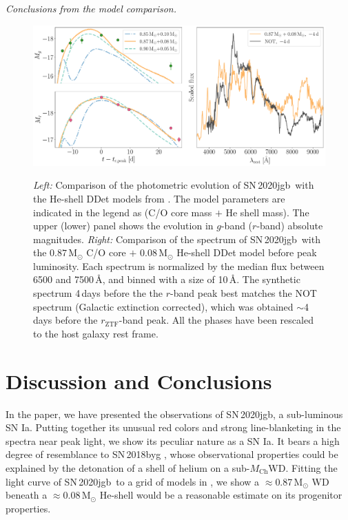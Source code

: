\documentclass[twocolumn]{aastex631}
\newcommand{\sn}{SN\,2020jgb}
\newcommand{\Mch}{$M_\mathrm{Ch}$}
\begin{document}
{\it Conclusions from the model comparison.}

\begin{figure}
    \centering
    \includegraphics[width=\textwidth]{model.pdf}
    \label{fig:model}
    \caption{{\it Left:} Comparison of the photometric evolution of \sn\ with the He-shell DDet models from \citet{polin_observational_2019}. The model parameters are indicated in the legend as (C/O core mass $+$ He shell mass). The upper (lower) panel shows the evolution in $g$-band ($r$-band) absolute magnitudes. {\it Right:} Comparison of the spectrum of \sn\ with the $0.87\,\mathrm{M_\odot}$ C/O core $+$ $0.08\,\mathrm{M_\odot}$ He-shell DDet model before peak luminosity. Each spectrum is normalized by the median flux between 6500 and 7500\,\r{A}, and binned with a size of 10\,\r{A}. The synthetic spectrum 4\,days before the the $r$-band peak best matches the NOT spectrum (Galactic extinction corrected), which was obtained $\sim$4\,days before the $r_\mathrm{ZTF}$-band peak. All the phases have been rescaled to the host galaxy rest frame. }
\end{figure}
\section{Discussion and Conclusions} \label{sec:discussion}
In the paper, we have presented the observations of \sn, a sub-luminous SN Ia. Putting together its unusual red colors and strong line-blanketing in the spectra near peak light, we show its peculiar nature as a SN Ia. It bears a high degree of resemblance to SN\,2018byg \citep{de_18byg_2019}, whose observational properties could be explained by the detonation of a shell of helium on a sub-\Mch WD. Fitting the light curve of \sn\ to a grid of models in \citet{polin_observational_2019}, we show a $\approx$0.87\,$\mathrm{M_\odot}$ WD beneath a $\approx$0.08\,$\mathrm{M_\odot}$ He-shell would be a reasonable estimate on its progenitor properties.
\end{document}
